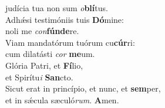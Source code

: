 \evenverse judícia tua non sum \textit{o}\textbf{blí}tus.\\
\oddverse Adhǽsi testimóniis tuis \textbf{Dó}mine:~\*\\
\oddverse noli me \textit{con}\textbf{fún}\textbf{de}re.\\
\evenverse Viam mandatórum tuórum cu\textbf{cúr}ri:~\*\\
\evenverse cum dilatásti \textit{cor} \textbf{me}um.\\
\oddverse Glória Patri, et \textbf{Fí}lio,~\*\\
\oddverse et Spirítu\textit{i} \textbf{San}cto.\\
\evenverse Sicut erat in princípio, et nunc, et \textbf{sem}per,~\*\\
\evenverse et in sǽcula sæculó\textit{rum}. \textbf{A}men.\\
